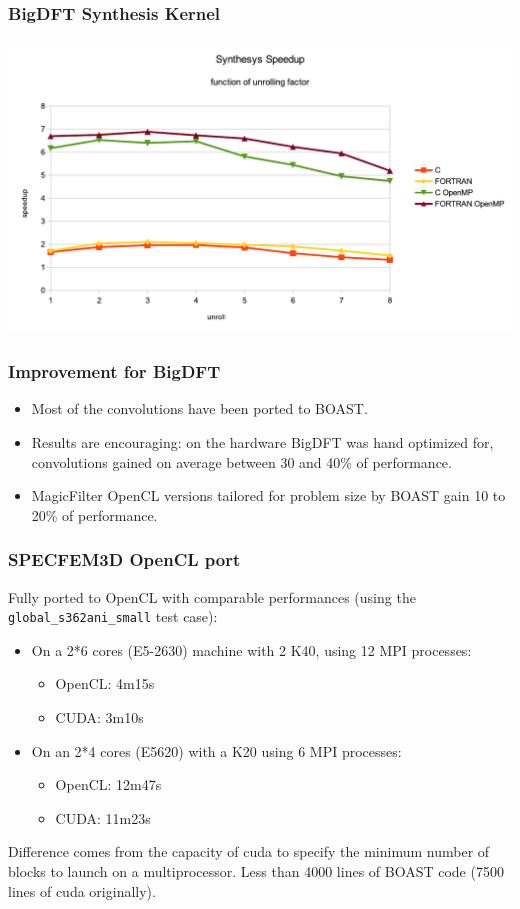 \documentclass{beamer}
\begin{document}
\begin{frame}
\frametitle{BigDFT Synthesis Kernel}
\centering 
\includegraphics[scale=0.5]{Res_synthesis}\\


\end{frame}


\begin{frame}
\frametitle{Improvement for BigDFT}
\begin{itemize}
\item Most of the convolutions have been ported to BOAST.
\item Results are encouraging: on the hardware BigDFT was hand optimized for, convolutions gained on average between 30 and 40\% of performance.
\item MagicFilter OpenCL versions tailored for problem size by BOAST gain 10 to 20\% of performance.
\end{itemize}
\end{frame}

\begin{frame}
\frametitle{SPECFEM3D OpenCL port}
Fully ported to OpenCL with comparable performances (using the \texttt{global\_s362ani\_small} test case):
\begin{itemize}
\item On a 2*6 cores (E5-2630) machine with 2 K40, using 12 MPI processes:
\begin{itemize}
\item OpenCL: 4m15s
\item CUDA: 3m10s
\end{itemize}
\item On an 2*4 cores (E5620) with a K20 using 6 MPI processes:
\begin{itemize}
\item OpenCL: 12m47s
\item CUDA: 11m23s
\end{itemize}
\end{itemize}
Difference comes from the capacity of cuda to specify the minimum number of blocks to launch on a multiprocessor.
Less than 4000 lines of BOAST code (7500 lines of cuda originally).
\end{frame}
\end{document}
